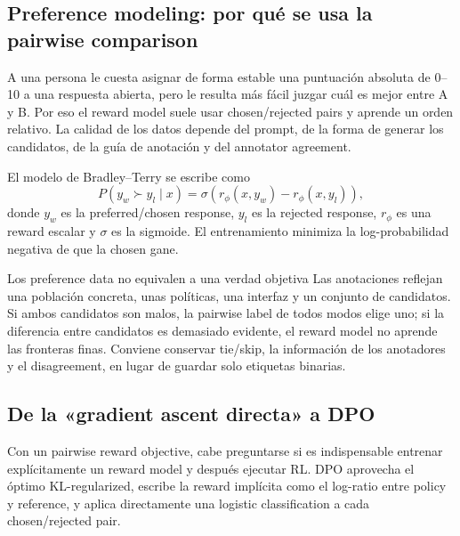 \subsection{Preference modeling: por qué se usa la pairwise comparison}

A una persona le cuesta asignar de forma estable una puntuación absoluta de 0--10 a una respuesta abierta, pero le resulta más fácil juzgar cuál es mejor entre A y B. Por eso el reward model suele usar chosen/rejected pairs y aprende un orden relativo. La calidad de los datos depende del prompt, de la forma de generar los candidatos, de la guía de anotación y del annotator agreement.


El modelo de Bradley--Terry se escribe como
\[
P(y_w\succ y_l\mid x)=\sigma\!\left(r_{\phi}(x,y_w)-r_{\phi}(x,y_l)\right),
\]
donde $y_w$ es la preferred/chosen response, $y_l$ es la rejected response, $r_{\phi}$ es una reward escalar y $\sigma$ es la sigmoide. El entrenamiento minimiza la log-probabilidad negativa de que la chosen gane.

\begin{warningbox}{Los preference data no equivalen a una verdad objetiva}
Las anotaciones reflejan una población concreta, unas políticas, una interfaz y un conjunto de candidatos. Si ambos candidatos son malos, la pairwise label de todos modos elige uno; si la diferencia entre candidatos es demasiado evidente, el reward model no aprende las fronteras finas. Conviene conservar tie/skip, la información de los anotadores y el disagreement, en lugar de guardar solo etiquetas binarias.
\end{warningbox}


\subsection{De la «gradient ascent directa» a DPO}

Con un pairwise reward objective, cabe preguntarse si es indispensable entrenar explícitamente un reward model y después ejecutar RL. DPO aprovecha el óptimo KL-regularized, escribe la reward implícita como el log-ratio entre policy y reference, y aplica directamente una logistic classification a cada chosen/rejected pair.

